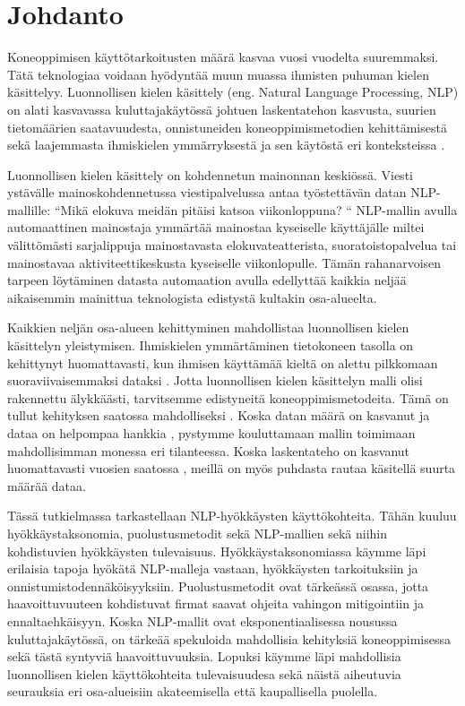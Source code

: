 \chapter{Johdanto\label{intro}}

Koneoppimisen käyttötarkoitusten määrä kasvaa vuosi vuodelta suuremmaksi. Tätä teknologiaa voidaan hyödyntää muun muassa ihmisten puhuman kielen käsittelyy. Luonnollisen kielen käsittely (eng. Natural Language Processing, NLP) on alati kasvavassa kuluttajakäytössä johtuen laskentatehon kasvusta, suurien tietomäärien saatavuudesta, onnistuneiden koneoppimismetodien kehittämisestä sekä laajemmasta ihmiskielen ymmärryksestä ja sen käytöstä eri konteksteissa \citep{doi:10.1126/science.aaa8685}.

Luonnollisen kielen käsittely on kohdennetun mainonnan keskiössä. Viesti ystävälle mainoskohdennetussa viestipalvelussa antaa työstettävän datan NLP-mallille: ``Mikä elokuva meidän pitäisi katsoa viikonloppuna? `` NLP-mallin avulla automaattinen mainostaja ymmärtää mainostaa kyseiselle käyttäjälle miltei välittömästi sarjalippuja mainostavasta elokuvateatterista, suoratoistopalvelua tai mainostavaa aktiviteettikeskusta kyseiselle viikonlopulle. Tämän rahanarvoisen tarpeen löytäminen datasta automaation avulla edellyttää kaikkia neljää aikaisemmin mainittua teknologista edistystä kultakin osa-alueelta.

Kaikkien neljän osa-alueen kehittyminen mahdollistaa luonnollisen kielen käsittelyn yleistymisen. Ihmiskielen ymmärtäminen tietokoneen tasolla on kehittynyt huomattavasti, kun ihmisen käyttämää kieltä on alettu pilkkomaan suoraviivaisemmaksi dataksi \citep{https://doi.org/10.1002/aris.1440370103}. Jotta luonnollisen kielen käsittelyn malli olisi rakennettu älykkäästi, tarvitsemme edistyneitä koneoppimismetodeita. Tämä on tullut kehityksen saatossa mahdolliseksi \citep{jordan2015machine}. Koska datan määrä on kasvanut ja dataa on helpompaa hankkia \citep{gopalakrishnan2018deep}, pystymme kouluttamaan mallin toimimaan mahdollisimman monessa eri tilanteessa. Koska laskentateho on kasvanut huomattavasti vuosien saatossa \citep{moore1965cramming}, meillä on myös puhdasta rautaa käsitellä suurta määrää dataa.

Tässä tutkielmassa tarkastellaan NLP-hyökkäysten käyttökohteita. Tähän kuuluu hyökkäystaksonomia, puolustusmetodit sekä NLP-mallien sekä niihin kohdistuvien hyökkäysten tulevaisuus. Hyökkäystaksonomiassa käymme läpi erilaisia tapoja hyökätä NLP-malleja vastaan, hyökkäysten tarkoituksiin ja onnistumistodennäköisyyksiin. Puolustusmetodit ovat tärkeässä osassa, jotta haavoittuvuuteen kohdistuvat firmat saavat ohjeita vahingon mitigointiin ja ennaltaehkäisyyn. Koska NLP-mallit ovat eksponentiaalisessa nousussa kuluttajakäytössä, on tärkeää spekuloida mahdollisia kehityksiä koneoppimisessa sekä tästä syntyviä haavoittuvuuksia. Lopuksi käymme läpi mahdollisia luonnollisen kielen käyttökohteita tulevaisuudesa sekä näistä aiheutuvia seurauksia eri osa-alueisiin akateemisella että kaupallisella puolella.